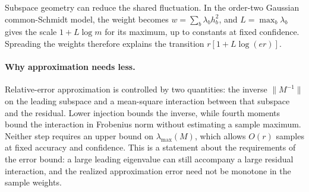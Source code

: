 \documentclass[11pt,a4paper]{article}
\theoremstyle{definition}\newtheorem{definition}[theorem]{Definition}
\theoremstyle{remark}\newtheorem{remark}[theorem]{Remark}
\numberwithin{equation}{section}
\newcommand{\norm}[1]{\lVert#1\rVert}\newcommand{\ip}[2]{\langle#1,#2\rangle}
\begin{document}
Subspace geometry can reduce the shared fluctuation. In the order-two
Gaussian common-Schmidt model, the weight becomes
$w=\sum_b\lambda_bh_b^2$, and $L=\max_b\lambda_b$ gives the scale
$1+L\log m$ for its maximum, up to constants at fixed confidence.
Spreading the weights therefore explains the transition
$r[1+L\log(er)]$.

\paragraph{Why approximation needs less.}
Relative-error approximation is controlled by two quantities: the
inverse $\norm{M^{-1}}$ on the leading subspace and a mean-square
interaction between that subspace and the residual. Lower injection
bounds the inverse, while fourth moments bound the interaction in
Frobenius norm without estimating a sample maximum. Neither step
requires an upper bound on $\lambda_{\max}(M)$, which allows
$O(r)$ samples at fixed accuracy and confidence. This is a statement
about the requirements of the error bound: a large leading eigenvalue
can still accompany a large residual interaction, and the realized
approximation error need not be monotone in the sample weights.
\end{document}
